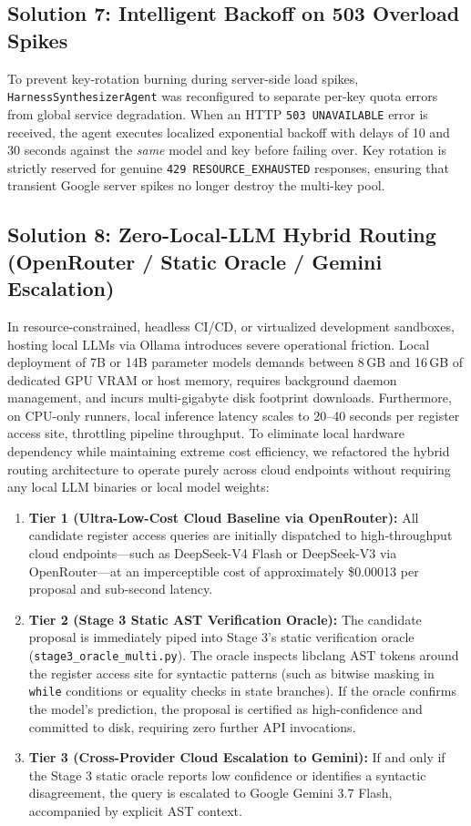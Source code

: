 \documentclass[11pt,a4paper]{article}
\begin{document}
\subsection{Solution 7: Intelligent Backoff on 503 Overload Spikes}
To prevent key-rotation burning during server-side load spikes, \texttt{HarnessSynthesizerAgent} was reconfigured to separate per-key quota errors from global service degradation. When an HTTP \texttt{503 UNAVAILABLE} error is received, the agent executes localized exponential backoff with delays of 10 and 30 seconds against the \textit{same} model and key before failing over. Key rotation is strictly reserved for genuine \texttt{429 RESOURCE\_EXHAUSTED} responses, ensuring that transient Google server spikes no longer destroy the multi-key pool.

\subsection{Solution 8: Zero-Local-LLM Hybrid Routing (OpenRouter / Static Oracle / Gemini Escalation)}
In resource-constrained, headless CI/CD, or virtualized development sandboxes, hosting local LLMs via Ollama introduces severe operational friction. Local deployment of 7B or 14B parameter models demands between 8\,GB and 16\,GB of dedicated GPU VRAM or host memory, requires background daemon management, and incurs multi-gigabyte disk footprint downloads. Furthermore, on CPU-only runners, local inference latency scales to 20--40 seconds per register access site, throttling pipeline throughput. To eliminate local hardware dependency while maintaining extreme cost efficiency, we refactored the hybrid routing architecture to operate purely across cloud endpoints without requiring any local LLM binaries or local model weights:
\begin{enumerate}[leftmargin=1.8em, itemsep=0.2em]
    \item \textbf{Tier 1 (Ultra-Low-Cost Cloud Baseline via OpenRouter):} All candidate register access queries are initially dispatched to high-throughput cloud endpoints---such as DeepSeek-V4 Flash or DeepSeek-V3 via OpenRouter---at an imperceptible cost of approximately \$0.00013 per proposal and sub-second latency.
    \item \textbf{Tier 2 (Stage 3 Static AST Verification Oracle):} The candidate proposal is immediately piped into Stage 3's static verification oracle (\texttt{stage3\_oracle\_multi.py}). The oracle inspects libclang AST tokens around the register access site for syntactic patterns (such as bitwise masking in \texttt{while} conditions or equality checks in state branches). If the oracle confirms the model's prediction, the proposal is certified as high-confidence and committed to disk, requiring zero further API invocations.
    \item \textbf{Tier 3 (Cross-Provider Cloud Escalation to Gemini):} If and only if the Stage 3 static oracle reports low confidence or identifies a syntactic disagreement, the query is escalated to Google Gemini 3.7 Flash, accompanied by explicit AST context.
\end{enumerate}
\end{document}
